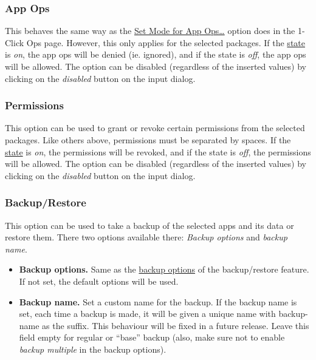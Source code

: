 
\subsubsection{App Ops} %
This behaves the same way as the \hyperref[subsec:set-mode-for-app-ops-dots]{Set Mode for App Ops\dots} option does in
the 1-Click Ops page. However, this only applies for the selected packages. If the
\hyperref[subsubsec:profile-state]{state} is \textit{on}, the app ops will be denied (ie. ignored), and if the state is
\textit{off}, the app ops will be allowed. The option can be disabled (regardless of the inserted values) by clicking
on the \textit{disabled} button on the input dialog.

\subsubsection{Permissions} %
This option can be used to grant or revoke certain permissions from the selected packages. Like others above,
permissions must be separated by spaces. If the \hyperref[subsubsec:profile-state]{state} is \textit{on}, the
permissions will be revoked, and if the state is \textit{off}, the permissions will be allowed. The option can be
disabled (regardless of the inserted values) by clicking on the \textit{disabled} button on the input dialog.

\subsubsection{Backup/Restore} %
This option can be used to take a backup of the selected apps and its data or restore them. There two options available
there: \textit{Backup options} and \textit{backup name}.
\begin{itemize}
    \item \textbf{Backup options.} Same as the \hyperref[subsec:backup-restore-backup-options]{backup options} of the
    backup/restore feature. If not set, the default options will be used.
    \item \textbf{Backup name.} Set a custom name for the backup. If the backup name is set, each time a backup is made,
    it will be given a unique name with backup-name as the suffix. This behaviour will be fixed in a future release.
    Leave this field empty for regular or ``base'' backup (also, make sure not to enable \textit{backup multiple} in the
    backup options).
\end{itemize}

